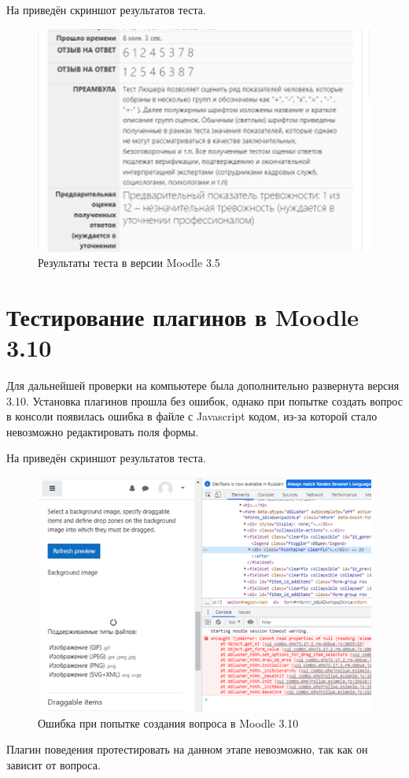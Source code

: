На  приведён скриншот результатов теста.
\FloatBarrier %
	\begin{figure}[ht] 
	\center
	\includegraphics [scale=1.2] {my_folder/images/result35}
	\caption{Результаты теста в версии Moodle 3.5} 
	\label{fig:res35}  
	\end{figure}
\FloatBarrier %
	


	
\section{Тестирование плагинов в Moodle 3.10} \label{ch2:sec-abbr} %
Для дальнейшей проверки на компьютере была дополнительно развернута версия 3.10. Установка плагинов прошла без ошибок, однако при попытке создать вопрос в консоли появилась ошибка в файле с Javascript кодом, из-за которой стало невозможно редактировать поля формы. 

На  приведён скриншот результатов теста.
\FloatBarrier %
\begin{figure}[ht] 
	\center
	\includegraphics [scale=1] {my_folder/images/result310}
	\caption{Ошибка при попытке создания вопроса в Moodle 3.10} 
	\label{fig:res310}  
\end{figure}
\FloatBarrier %

Плагин поведения протестировать на данном этапе невозможно, так как он зависит от вопроса.
